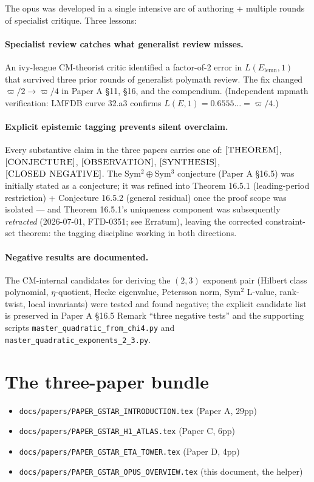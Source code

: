 \documentclass[11pt]{amsart}
\begin{document}
The opus was developed in a single intensive arc of authoring + multiple
rounds of specialist critique. Three lessons:

\paragraph{Specialist review catches what generalist review misses.} An
ivy-league CM-theorist critic identified a factor-of-2 error in
$L(E_{\mathrm{lemn}}, 1)$ that survived three prior rounds of generalist
polymath review. The fix changed $\varpi/2 \to \varpi/4$ in Paper A
\S 11, \S 16, and the compendium. (Independent mpmath verification:
LMFDB curve 32.a3 confirms $L(E, 1) = 0.6555\ldots = \varpi/4$.)

\paragraph{Explicit epistemic tagging prevents silent overclaim.} Every
substantive claim in the three papers carries one of:
$[\textsc{THEOREM}]$, $[\textsc{CONJECTURE}]$, $[\textsc{OBSERVATION}]$,
$[\textsc{SYNTHESIS}]$, $[\textsc{CLOSED NEGATIVE}]$. The Sym$^{2}\oplus$Sym$^{3}$
conjecture (Paper A \S 16.5) was initially stated as a conjecture; it
was refined into Theorem 16.5.1 (leading-period restriction) +
Conjecture 16.5.2 (general residual) once the proof scope was
isolated --- and Theorem 16.5.1's uniqueness component was subsequently
\emph{retracted} (2026-07-01, FTD-0351; see Erratum), leaving the
corrected constraint-set theorem: the tagging discipline working in both
directions.

\paragraph{Negative results are documented.} The CM-internal candidates
for deriving the $(2, 3)$ exponent pair (Hilbert class polynomial,
$\eta$-quotient, Hecke eigenvalue, Petersson norm, Sym$^{2}$ L-value,
rank-twist, local invariants) were tested and found negative; the
explicit candidate list is preserved in Paper A \S 16.5 Remark
``three negative tests'' and the supporting scripts
\texttt{master\_quadratic\_from\_chi4.py} and
\texttt{master\_quadratic\_exponents\_2\_3.py}.

\section*{The three-paper bundle}

\begin{itemize}[leftmargin=*, itemsep=2pt]
\item \texttt{docs/papers/PAPER\_GSTAR\_INTRODUCTION.tex} (Paper A, 29pp)
\item \texttt{docs/papers/PAPER\_GSTAR\_H1\_ATLAS.tex} (Paper C, 6pp)
\item \texttt{docs/papers/PAPER\_GSTAR\_ETA\_TOWER.tex} (Paper D, 4pp)
\item \texttt{docs/papers/PAPER\_GSTAR\_OPUS\_OVERVIEW.tex} (this document, the helper)
\end{itemize}
\end{document}
